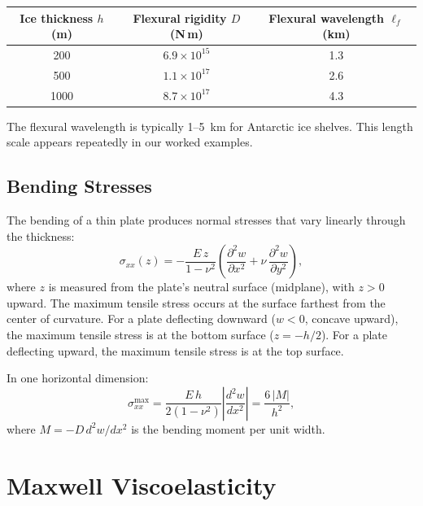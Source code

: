 \documentclass[11pt]{article}
\begin{document}
\begin{center}
\begin{tabular}{ccc}
\toprule
Ice thickness $h$ (m) & Flexural rigidity $D$ (N\,m) & Flexural wavelength $\ell_f$ (km) \\
\midrule
200 & $6.9 \times 10^{15}$ & 1.3 \\
500 & $1.1 \times 10^{17}$ & 2.6 \\
1000 & $8.7 \times 10^{17}$ & 4.3 \\
\bottomrule
\end{tabular}
\end{center}

\noindent The flexural wavelength is typically 1--5~km for Antarctic ice shelves.  This length scale appears repeatedly in our worked examples.

\subsection{Bending Stresses}
\label{sec:bending_stresses}

The bending of a thin plate produces normal stresses that vary linearly through the thickness:
\begin{equation}
  \sigma_{xx}(z) = -\frac{E\,z}{1-\nu^2}\left(\frac{\partial^2 w}{\partial x^2} + \nu\,\frac{\partial^2 w}{\partial y^2}\right),
  \label{eq:bending_stress}
\end{equation}
where $z$ is measured from the plate's neutral surface (midplane), with $z > 0$ upward.  The maximum tensile stress occurs at the surface farthest from the center of curvature.  For a plate deflecting downward ($w < 0$, concave upward), the maximum tensile stress is at the bottom surface ($z = -h/2$).  For a plate deflecting upward, the maximum tensile stress is at the top surface.

\medskip
\noindent In one horizontal dimension:
\begin{equation}
  \sigma_{xx}^{\text{max}} = \frac{E\,h}{2(1-\nu^2)}\left|\frac{d^2 w}{dx^2}\right| = \frac{6\,|M|}{h^2},
  \label{eq:max_bending_stress}
\end{equation}
where $M = -D\,d^2w/dx^2$ is the bending moment per unit width.

\section{Maxwell Viscoelasticity}
\label{sec:maxwell}
\end{document}
